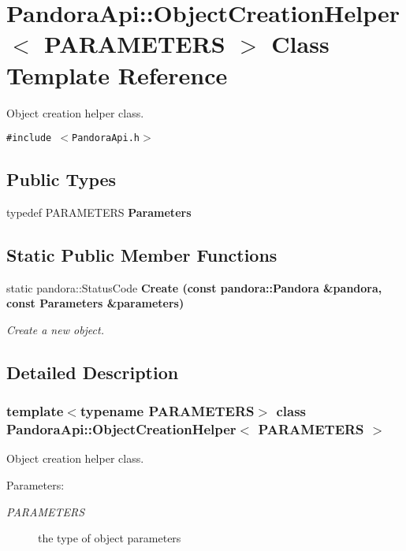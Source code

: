 \section{Pandora\-Api::Object\-Creation\-Helper$<$ PARAMETERS $>$ Class Template Reference}
\label{classPandoraApi_1_1ObjectCreationHelper}
Object creation helper class.  


{\tt \#include $<$Pandora\-Api.h$>$}

\subsection*{Public Types}
\begin{CompactItemize}
\item 
typedef PARAMETERS \textbf{Parameters}\label{classPandoraApi_1_1ObjectCreationHelper_7bdaf435ea42d45ddad9e1e642633d3a}

\end{CompactItemize}
\subsection*{Static Public Member Functions}
\begin{CompactItemize}
\item 
static pandora::Status\-Code \bf{Create} (const \bf{pandora::Pandora} \&pandora, const Parameters \&parameters)
\begin{CompactList}\small\item\em Create a new object. \item\end{CompactList}\end{CompactItemize}


\subsection{Detailed Description}
\subsubsection*{template$<$typename PARAMETERS$>$ class Pandora\-Api::Object\-Creation\-Helper$<$ PARAMETERS $>$}

Object creation helper class. 

\begin{Desc}
\item[Parameters:]
\begin{description}
\item[{\em PARAMETERS}]the type of object parameters \end{description}
\end{Desc}




